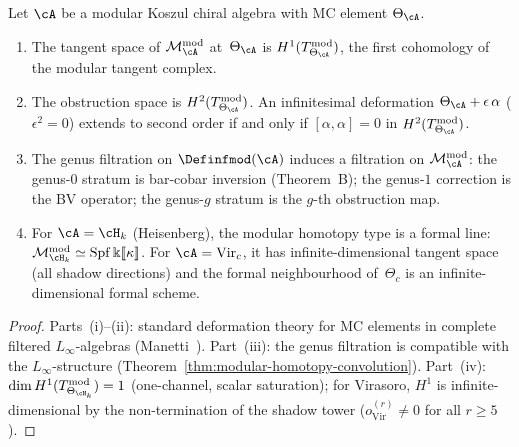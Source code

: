 \begin{proposition}
\label{prop:modular-homotopy-type-structure}
Let $\cA$ be a modular Koszul chiral algebra with MC element
$\Theta_\cA$.
\begin{enumerate}[label=\textup{(\roman*)}]
\item The tangent space of
  $\mathcal{M}^{\mathrm{mod}}_\cA$ at~$\Theta_\cA$ is
  $H^1(T^{\mathrm{mod}}_{\Theta_\cA})$, the first cohomology
  of the modular tangent complex.
\item The obstruction space is
  $H^2(T^{\mathrm{mod}}_{\Theta_\cA})$.
  An infinitesimal deformation $\Theta_\cA + \epsilon\,\alpha$
  ($\epsilon^2=0$) extends to second order if and only if
  $[\alpha,\alpha]=0$ in
  $H^2(T^{\mathrm{mod}}_{\Theta_\cA})$.
\item The genus filtration on $\Definfmod(\cA)$ induces a
  filtration on $\mathcal{M}^{\mathrm{mod}}_\cA$:
  the genus-$0$ stratum is bar-cobar inversion
  (Theorem~B); the genus-$1$ correction is the BV
  operator; the genus-$g$ stratum is the $g$-th
  obstruction map.
\item For $\cA=\cH_k$ (Heisenberg), the modular homotopy type
  is a formal line: $\mathcal{M}^{\mathrm{mod}}_{\cH_k}
  \simeq\mathrm{Spf}\,\Bbbk[\![\kappa]\!]$.
  For $\cA=\mathrm{Vir}_c$, it has infinite-dimensional
  tangent space (all shadow directions) and the formal
  neighbourhood of~$\Theta_c$ is an infinite-dimensional
  formal scheme.
\end{enumerate}
\end{proposition}

\begin{proof}
Parts~(i)--(ii): standard deformation theory for MC elements in
complete filtered $L_\infty$-algebras
(Manetti~\cite{Manetti04a}).
Part~(iii): the genus filtration is compatible with
the $L_\infty$-structure
(Theorem~\ref{thm:modular-homotopy-convolution}).
Part~(iv): $\dim H^1(T^{\mathrm{mod}}_{\Theta_{\cH_k}})=1$
(one-channel, scalar saturation); for Virasoro,
$H^1$ is infinite-dimensional by the non-termination of
the shadow tower ($o^{(r)}_{\mathrm{Vir}}\neq 0$ for all
$r\geq 5$).
\end{proof}

